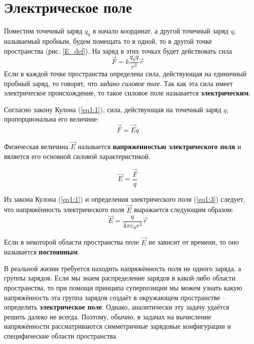 
\section{Электрическое поле}
    Поместим точечный заряд \( q_0 \) в начало координат, а другой точечный
    заряд \( q \), называемый пробным, будем помещать то в одной, то в другой
    точке пространства (рис. \ref{E_def}). На заряд в этих точках будет
    действовать сила
    \[
        \vec{F} = k\frac{q_0q}{r^3}\vec{r}
    \]
    Если в каждой точке пространства определена сила, действующая на единичный
    пробный заряд, то говорят, что \textit{задано силовое поле}. Так как эта
    сила имеет электрическое происхождение, то такое силовое поле называется
    \textbf{электрическим}.

    Согласно закону Кулона (\ref{eq1:1}), сила, действующая на точечный заряд
    \( q \), пропорциональна его величине:
    \begin{equation}
        \vec{F} = \vec{E}q\label{eq1:3}
    \end{equation}

    \begin{definition}
        Физическая величина \( \vec{E} \) называется \textbf{напряженностью
        электрического поля} и является его основной силовой характеристикой.
    \end{definition}
    \begin{equation}
        \vec{E}=\frac{\vec{F}}{q} \label{eq1:4}
    \end{equation}

    Из закона Кулона (\ref{eq1:1}) и определения электрического поля
    (\ref{eq1:3}) следует, что напряжённость электрического поля \( \vec{E} \)
    выражается следующим образом:
    \begin{equation}
        \vec{E} = \frac{q}{4\pi\varepsilon_0 r^3}\vec{r} \label{eq1:5}
    \end{equation}

    \begin{definition}
        Если в некоторой области пространства поле \(\vec{E}\) не зависит от
        времени, то оно называется \textbf{постоянным}.
    \end{definition}

    В реальной жизни требуется находить напряжённость поля не одного заряда, а
    группы зарядов. Если мы знаем распределение зарядов в какой-либо области
    пространства, то при помощи принципа суперпозиции  мы можем узнать какую
    напряжённость эта группа зарядов создаёт в окружающем пространстве --
    определить \textbf{электрическое поле}. Однако, аналитически эту задачу
    удаётся решить далеко не всегда. Поэтому, обычно, в задачах на вычисление
    напряжённости рассматриваются симметричные зарядовые конфигурации и
    специфические области пространства.

